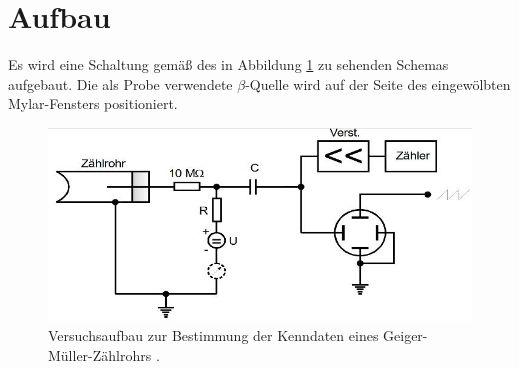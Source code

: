 \section{Aufbau}
\label{sec:Aufbau}
Es wird eine Schaltung gemäß des in Abbildung \ref{fig:Aufbau} zu sehenden Schemas aufgebaut. Die als Probe verwendete $\beta$-Quelle wird auf der Seite des eingewölbten Mylar-Fensters positioniert. 
\begin{figure}
\centering
\includegraphics[scale=0.5]{content/images/aufbau2.jpg}
\caption{Versuchsaufbau zur Bestimmung der Kenndaten eines Geiger-Müller-Zählrohrs \cite{V703}.}
\label{fig:Aufbau}
\end{figure}
